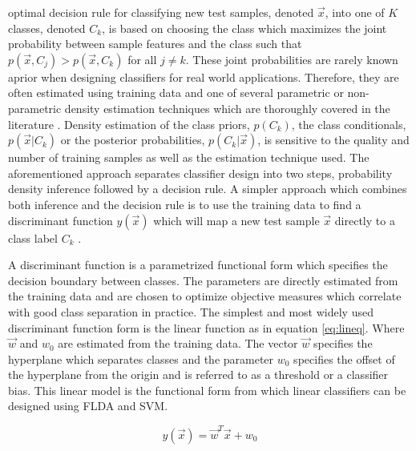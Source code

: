 \documentclass[journal]{IEEEtran}
\begin{document}
 optimal decision rule for classifying new test samples, denoted \(\vec{x}\), into one of \(K\) classes, denoted \(C_k\), is based on choosing the class which maximizes the joint probability between sample features and the class such that \(p(\vec{x}, C_j) > p(\vec{x}, C_k)\) for all \(j \ne k\). These joint probabilities are rarely known aprior when designing classifiers for real world applications. Therefore, they are often estimated using training data and one of several parametric or non-parametric density estimation techniques which are thoroughly covered in the literature \cite[p.~33-73]{bishop1}\cite[p.~20-213]{duda}. Density estimation of the class priors, \(p(C_k)\), the class conditionals, \(p(\vec{x}|C_k)\) or the posterior probabilities, \(p(C_k|\vec{x})\), is sensitive to the quality and number of training samples as well as the estimation technique used. The aforementioned approach separates classifier design into two steps, probability density inference followed by a decision rule. A simpler approach which combines both inference and the decision rule is to use the training data to find a discriminant function \(y(\vec{x})\) which will map a new test sample \(\vec{x}\) directly to a class label \(C_k\) \cite[p.~44]{bishop2}.

\par A discriminant function is a parametrized functional form which specifies the decision boundary between classes. The parameters are directly estimated from the training data and are chosen to optimize objective measures which correlate with good class separation in practice. The simplest and most widely used discriminant function form is the linear function as in equation \ref{eq:lineq}. Where \(\vec{w}\) and \(w_0\) are estimated from the training data. The vector \(\vec{w}\) specifies the hyperplane which separates classes and the parameter \(w_0\) specifies the offset of the hyperplane from the origin and is referred to as a threshold or a classifier bias. This linear model is the functional form from which linear classifiers can be designed using FLDA and SVM.

\begin{equation}
\label{eq:lineq}
y(\vec{x}) = \vec{w}^T\vec{x} + w_0
\end{equation}

\end{document}
